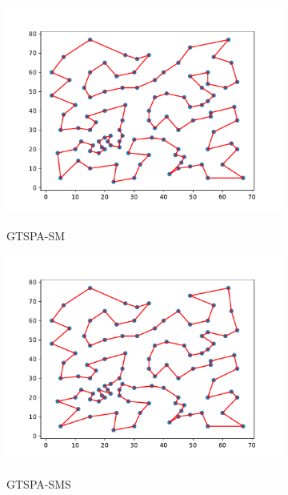 \documentclass[12pt]{article}
\theoremstyle{plain}
\theoremstyle{definition}
\theoremstyle{remark}
\begin{document}
\begin{figure}[ht]
\begin{subfigure}{.5\textwidth}
		\includegraphics[scale = 0.44]{../../Implementation/gen/best_path_gtspasm_eil101}
		\label{fig:best_path_gtspasm_eil101}
		\caption{GTSPA-SM}
	\end{subfigure}%
	\begin{subfigure}{.5\textwidth}
		\centering
		\includegraphics[scale = 0.44]{../../Implementation/gen/best_path_gtspasms_eil101}
		\label{fig:best_path_gtspasms_eil101}
		\caption{GTSPA-SMS}
	\end{subfigure}
	\begin{subfigure}{.5\textwidth}
		\centering

\end{subfigure}
\end{figure}
\end{document}
